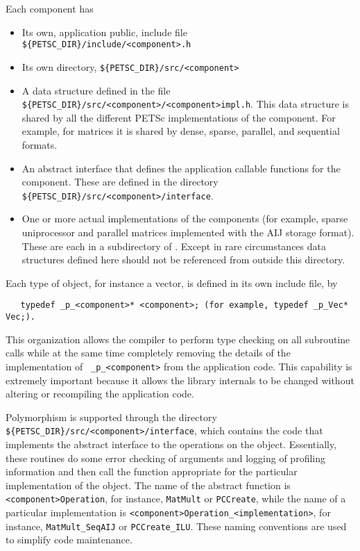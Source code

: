 \documentclass[twoside,12pt]{../sty/report_petsc}
\begin{document}
Each component has
\begin{itemize}
\item Its own, application public, include file {\tt \$\{PETSC\_DIR\}/include/<component>.h} 
\item Its own directory, {\tt \$\{PETSC\_DIR\}/src/<component>}
\item A data structure defined in  the file
      {\tt \$\{PETSC\_DIR\}/src/<component>/<component>impl.h}.
      This data structure is shared by all the different PETSc implementations of the 
      component. For example, for matrices it is shared by dense,
      sparse, parallel, and sequential formats.
\item An abstract interface that defines the application callable 
      functions for the component. These are defined in the directory
      {\tt \$\{PETSC\_DIR\}/src/<component>/interface}.
\item One or more actual implementations of the components (for example,
      sparse uniprocessor and parallel matrices implemented with the AIJ storage format).
      These are each in a subdirectory of 
      . Except in rare
      circumstances data 
      structures defined here should not be referenced from outside this 
      directory.
\end{itemize}

Each type of object, for instance a vector, is defined in its own
include file, by 
\begin{verbatim}
   typedef _p_<component>* <component>; (for example, typedef _p_Vec* Vec;).
\end{verbatim}
  This organization
allows the compiler to perform type checking on all subroutine calls
while at the same time
completely removing the details of the implementation of {\tt
\_p\_<component>} from the application code.  This capability is extremely important
because it allows the library internals to be changed
without altering or recompiling the application code.

Polymorphism is supported through the directory 
{\tt \$\{PETSC\_DIR\}/src/<component>/interface},
which contains the code that implements the abstract interface to the
operations on the object.  Essentially, these routines do some error
checking of arguments and logging of profiling information 
and then call the function appropriate for the
particular implementation of the object. The name of the abstract
function is {\tt <component>Operation}, for instance, {\tt MatMult} or {\tt PCCreate}, while
the name of a particular implementation is 
{\tt <component>Operation\_<implementation>}, for instance, 
{\tt MatMult\_SeqAIJ} or {\tt PCCreate\_ILU}. These naming
conventions are used to simplify code maintenance.
\end{document}
